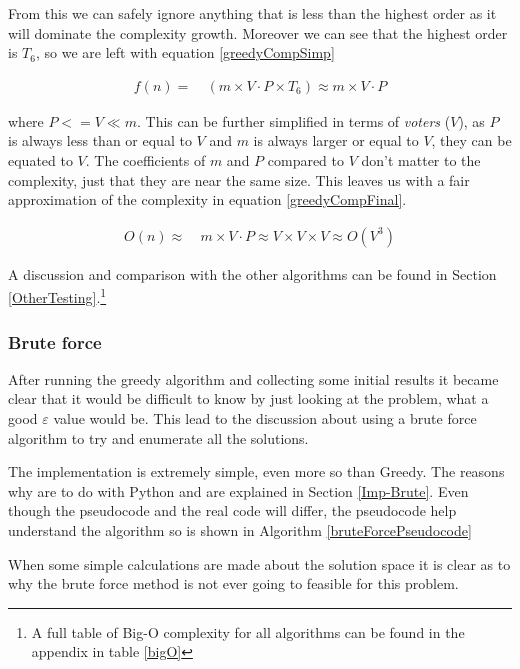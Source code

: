 \documentclass[12pt]{report}
\begin{document}
From this we can safely ignore anything that is less than the highest order as it will dominate the complexity growth. Moreover we can see that the highest order is $T_6$, so we are left with equation \ref{greedyCompSimp}

\begin{equation}\label{greedyCompSimp}
\begin{aligned}
	f(n) ={} & \ (m \times V \cdot P \times T_6) \approx m \times V \cdot P
\end{aligned}
\end{equation}

where $P <= V \ll m$. This can be further simplified in terms of \textit{voters} ($V$), as $P$ is always less than or equal to $V$ and $m$ is always larger or equal to $V$, they can be equated to $V$. The coefficients of $m$ and $P$ compared to $V$ don't matter to the complexity, just that they are near the same size. This leaves us with a fair approximation of the complexity in equation \ref{greedyCompFinal}.

\begin{equation}\label{greedyCompFinal}
\begin{aligned}
	O(n) \approx{} & \ m \times V \cdot P \approx V \times V \times V \approx O(V^3)
\end{aligned}
\end{equation}

A discussion and comparison with the other algorithms can be found in Section \ref{OtherTesting}.\footnote{A full table of Big-O complexity for all algorithms can be found in the appendix in table \ref{bigO}}

\subsubsection{Brute force}
After running the greedy algorithm and collecting some initial results it became clear that it would be difficult to know by just looking at the problem, what a good $\varepsilon$ value would be. This lead to the discussion about using a brute force algorithm to try and enumerate all the solutions.

The implementation is extremely simple, even more so than Greedy. The reasons why are to do with Python and are explained in Section \ref{Imp-Brute}. Even though the pseudocode and the real code will differ, the pseudocode help understand the algorithm so is shown in Algorithm \ref{bruteForcePseudocode}

When some simple calculations are made about the solution space it is clear as to why the brute force method is not ever going to feasible for this problem. 
\end{document}
